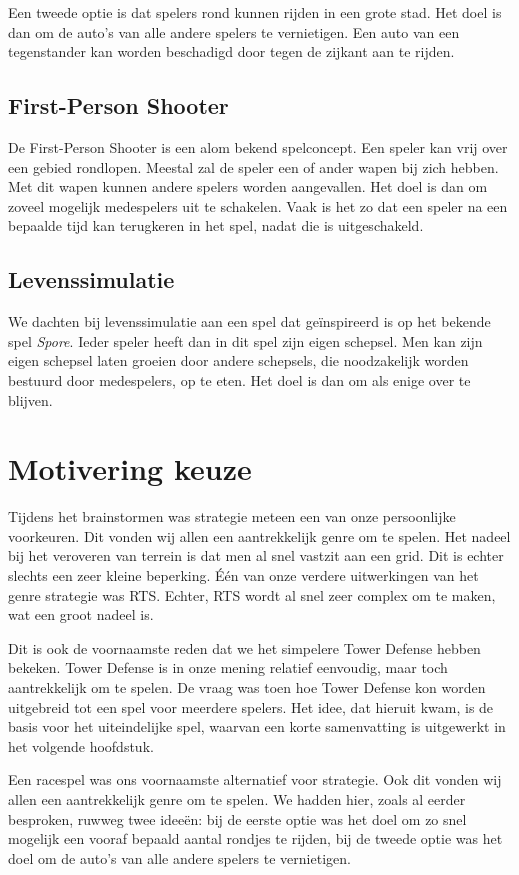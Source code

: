 Een tweede optie is dat spelers rond kunnen rijden in een grote stad. Het doel is dan om de auto's van alle andere spelers te vernietigen. Een auto van een tegenstander kan worden beschadigd door tegen de zijkant aan te rijden.

\subsection{First-Person Shooter}
De First-Person Shooter is een alom bekend spelconcept. Een speler kan vrij over een gebied rondlopen. Meestal zal de speler een of ander wapen bij zich hebben. Met dit wapen kunnen andere spelers worden aangevallen. Het doel is dan om zoveel mogelijk medespelers uit te schakelen. Vaak is het zo dat een speler na een bepaalde tijd kan terugkeren in het spel, nadat die is uitgeschakeld.

\subsection{Levenssimulatie}
We dachten bij levenssimulatie aan een spel dat ge\"inspireerd is op het bekende spel \emph{Spore}. Ieder speler heeft dan in dit spel zijn eigen schepsel. Men kan zijn eigen schepsel laten groeien door andere schepsels, die noodzakelijk worden bestuurd door medespelers, op te eten. Het doel is dan om als enige over te blijven.

\section{Motivering keuze}
Tijdens het brainstormen was strategie meteen een van onze persoonlijke voorkeuren. Dit vonden wij allen een aantrekkelijk genre om te spelen. Het nadeel bij het veroveren van terrein is dat men al snel vastzit aan een grid. Dit is echter slechts een zeer kleine beperking. \'E\'en van onze verdere uitwerkingen van het genre strategie was RTS. Echter, RTS wordt al snel zeer complex om te maken, wat een groot nadeel is.

Dit is ook de voornaamste reden dat we het simpelere Tower Defense hebben bekeken. Tower Defense is in onze mening relatief eenvoudig, maar toch aantrekkelijk om te spelen. De vraag was toen hoe Tower Defense kon worden uitgebreid tot een spel voor meerdere spelers. Het idee, dat hieruit kwam, is de basis voor het uiteindelijke spel, waarvan een korte samenvatting is uitgewerkt in het volgende hoofdstuk.

Een racespel was ons voornaamste alternatief voor strategie. Ook dit vonden wij allen een aantrekkelijk genre om te spelen. We hadden hier, zoals al eerder besproken, ruwweg twee idee\"en: bij de eerste optie was het doel om zo snel mogelijk een vooraf bepaald aantal rondjes te rijden, bij de tweede optie was het doel om de auto's van alle andere spelers te vernietigen.

